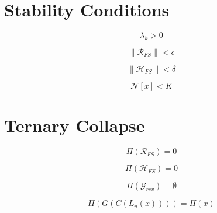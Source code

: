 
\section*{Stability Conditions}

\[
\lambda_k > 0
\]

\[
\|\mathcal{R}_{FS}\| < \epsilon
\]

\[
\|\mathcal{H}_{FS}\| < \delta
\]

\[
\mathcal{N}[x] < K
\]


\section*{Ternary Collapse}

\[
\Pi(\mathcal{R}_{FS}) = 0
\]

\[
\Pi(\mathcal{H}_{FS}) = 0
\]

\[
\Pi(\mathcal{G}_{rev}) = \emptyset
\]

\[
\Pi(G(C(L_u(x)))) = \Pi(x)
\]

